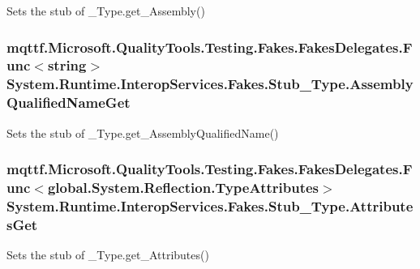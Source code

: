 Sets the stub of \-\_\-\-Type.\-get\-\_\-\-Assembly()

\hypertarget{class_system_1_1_runtime_1_1_interop_services_1_1_fakes_1_1_stub___type_a7724702f77ae55a0867cf8b052f72651}{
\subsubsection[{Assembly\-Qualified\-Name\-Get}]{\setlength{\rightskip}{0pt plus 5cm}mqttf.\-Microsoft.\-Quality\-Tools.\-Testing.\-Fakes.\-Fakes\-Delegates.\-Func$<$string$>$ System.\-Runtime.\-Interop\-Services.\-Fakes.\-Stub\-\_\-\-Type.\-Assembly\-Qualified\-Name\-Get}}\label{class_system_1_1_runtime_1_1_interop_services_1_1_fakes_1_1_stub___type_a7724702f77ae55a0867cf8b052f72651}


Sets the stub of \-\_\-\-Type.\-get\-\_\-\-Assembly\-Qualified\-Name()

\hypertarget{class_system_1_1_runtime_1_1_interop_services_1_1_fakes_1_1_stub___type_a8250896a28e04cb02a0de8a69cfc9d92}{
\subsubsection[{Attributes\-Get}]{\setlength{\rightskip}{0pt plus 5cm}mqttf.\-Microsoft.\-Quality\-Tools.\-Testing.\-Fakes.\-Fakes\-Delegates.\-Func$<$global.\-System.\-Reflection.\-Type\-Attributes$>$ System.\-Runtime.\-Interop\-Services.\-Fakes.\-Stub\-\_\-\-Type.\-Attributes\-Get}}\label{class_system_1_1_runtime_1_1_interop_services_1_1_fakes_1_1_stub___type_a8250896a28e04cb02a0de8a69cfc9d92}


Sets the stub of \-\_\-\-Type.\-get\-\_\-\-Attributes()

